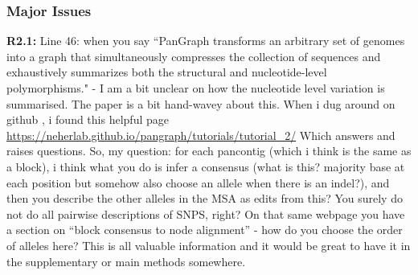 \documentclass[aps,rmp,onecolumn]{revtex4-1}
\newcommand{\Marco}[1]{{\color{gray}Marco: #1}}
\newcommand{\Liam}[1]{{\color{teal}Liam: #1}}
\newcommand{\reviewer}[2]{\textbf{#1:} #2\vskip 5mm}
\begin{document}
\subsubsection*{Major Issues}

\reviewer{R2.1}{Line 46: when you say ``PanGraph transforms an arbitrary set of genomes into a graph that simultaneously compresses the collection of sequences and exhaustively summarizes both the structural and nucleotide-level polymorphisms." - I am a bit unclear on how the nucleotide level variation is summarised. The paper is a bit hand-wavey about this. When i dug around on github , i found this helpful page \url{https://neherlab.github.io/pangraph/tutorials/tutorial_2/} Which answers and raises questions. So, my question: for each pancontig (which i think is the same as a block), i think what you do is infer a consensus (what is this? majority base at each position but somehow also choose an allele when there is an indel?), and then you describe the other alleles in the MSA as edits from this? You surely do not do all pairwise descriptions of SNPS, right? On that same webpage you have a section on ``block consensus to node alignment'' - how do you choose the order of alleles here? This is all valuable information and it would be great to have it in the supplementary or main methods somewhere.}
\end{document}
